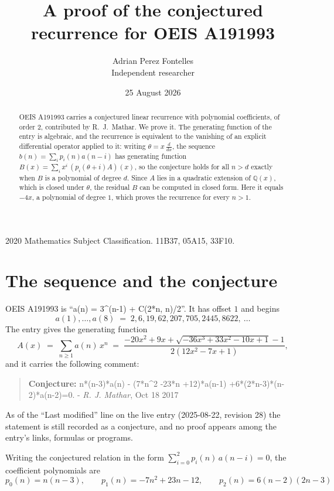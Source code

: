 \documentclass[11pt,a4paper]{article}
\title{A proof of the conjectured recurrence for OEIS A191993}
\author{Adrian Perez Fontelles\\ \small Independent researcher}
\date{25 August 2026}
\theoremstyle{plain}
\theoremstyle{definition}
\begin{document}
\maketitle

\begin{abstract}
OEIS A191993 carries a conjectured linear recurrence with polynomial coefficients, of
order 2, contributed by R.~J.~Mathar. We prove it. The generating function of the
entry is algebraic, and the recurrence is equivalent to the vanishing of an explicit
differential operator applied to it: writing $\theta=x\,\frac{d}{dx}$, the sequence
$b(n)=\sum_{i}p_{i}(n)a(n-i)$ has generating function
$B(x)=\sum_{i}x^{i}\,(p_{i}(\theta+i)A)(x)$, so the conjecture holds for all $n>d$ exactly
when $B$ is a polynomial of degree $d$. Since $A$ lies in a quadratic extension of
$\mathbb{Q}(x)$, which is closed under $\theta$, the residual $B$ can be computed in
closed form. Here it equals $- 4 x$, a polynomial of degree $1$, which proves
the recurrence for every $n>1$.
\end{abstract}

\noindent\small 2020 Mathematics Subject Classification. 11B37, 05A15, 33F10.\normalsize

\section{The sequence and the conjecture}

OEIS A191993 is ``a(n) = 3\^{}(n-1) + C(2*n, n)/2''. It has offset $1$ and begins
\[
a(1),\dots,a(8)\;=\;2, 6, 19, 62, 207, 705, 2445, 8622,\ \dots
\]
The entry gives the generating function
\begin{equation}\label{eq:gf}
A(x)\;=\;\sum_{n\ge 1} a(n)\,x^{n}\;=\;\frac{- 20 x^{2} + 9 x + \sqrt{- 36 x^{3} + 33 x^{2} - 10 x + 1} - 1}{2 \left(12 x^{2} - 7 x + 1\right)} ,
\end{equation}
and it carries the following comment:
\begin{quote}\small
\textbf{Conjecture:} n*(n-3)*a(n) - (7*n\^{}2 -23*n +12)*a(n-1) +6*(2*n-3)*(n-2)*a(n-2)=0. - \emph{R. J. Mathar}, Oct 18 2017
\end{quote}
As of the ``Last modified'' line on the live entry (2025-08-22, revision 28) the
statement is still recorded as a conjecture, and no proof appears among the entry's links,
formulas or programs.

Writing the conjectured relation in the form $\sum_{i=0}^{2}p_{i}(n)\,a(n-i)=0$,
the coefficient polynomials are
\[
p_{0}(n)=n \left(n - 3\right),\qquad p_{1}(n)=- 7 n^{2} + 23 n - 12,\qquad p_{2}(n)=6 \left(n - 2\right) \left(2 n - 3\right)
\]
\end{document}
